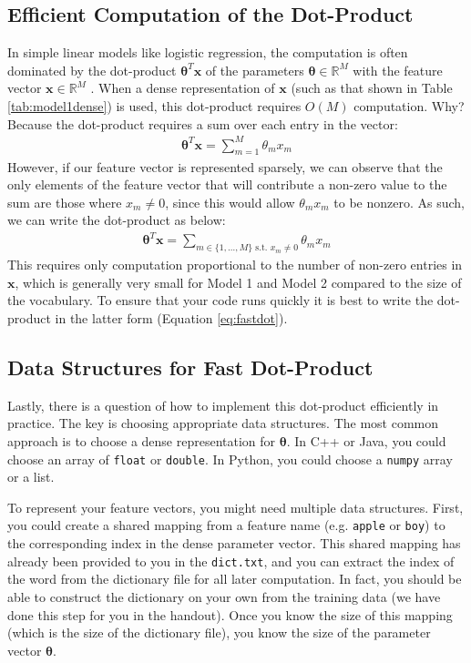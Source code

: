 \documentclass[11pt,addpoints,answers]{exam}
\newcommand{\Rb}{\mathbb{R}}
\newcommand{\xv}{\mathbf{x}}
\newcommand{\thetav     }{\boldsymbol \theta     }
\begin{document}
\subsection{Efficient Computation of the Dot-Product} \label{efficientdp}

In simple linear models like logistic regression, the computation is often dominated by the dot-product $\thetav^T \xv$ of the parameters $\thetav \in \Rb^M$ with the feature vector $\xv \in \Rb^M$ . When a dense representation of $\xv$ (such as that shown in Table \ref{tab:model1dense}) is used, this dot-product requires $O(M)$ computation. Why? Because the dot-product requires a sum over each entry in the vector:
\begin{align}
\thetav^T \xv = \sum_{m=1}^M \theta_m x_m
\end{align}
%
However, if our feature vector is represented sparsely, we can observe that the only elements of the feature vector that will contribute a non-zero value to the sum are those where $x_m \neq 0$, since this would allow $\theta_m x_m$ to be nonzero. As such, we can write the dot-product as below:
\begin{align}
\thetav^T \xv = \sum_{m \in \{1,\ldots,M\} \text{ s.t. } x_m \neq 0} \theta_m x_m
\label{eq:fastdot}
\end{align}
This requires only computation proportional to the number of non-zero entries in $\xv$, which is generally very small for Model 1 and Model 2 compared to the size of the vocabulary. To ensure that your code runs quickly it is best to write the dot-product in the latter form (Equation \eqref{eq:fastdot}).

\subsection{Data Structures for Fast Dot-Product} \label{datastructuredp}

Lastly, there is a question of how to implement this dot-product efficiently in practice. The key is choosing appropriate data structures. The most common approach is to choose a dense representation for $\thetav$. In C++ or Java, you could choose an array of \lstinline{float} or \lstinline{double}. In Python, you could choose a \lstinline{numpy} array or a list. 

To represent your feature vectors, you might need multiple data structures. First, you could create a shared mapping from a feature  name (e.g. {\tt apple} or {\tt boy}) to the corresponding index in the dense parameter vector. This shared mapping has already been provided to you in the \lstinline{dict.txt}, and you can extract the index of the word from the dictionary file for all later computation. In fact, you should be able to construct the dictionary on your own from the training data (we have done this step for you in the handout). Once you know the size of this mapping (which is the size of the dictionary file), you know the size of the parameter vector $\thetav$. 
\end{document}
